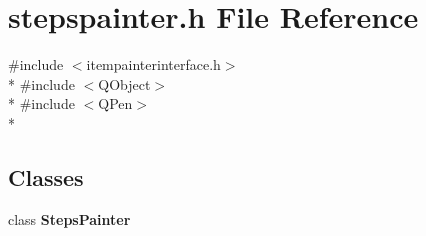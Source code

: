 \section{stepspainter.\+h File Reference}
\label{curve_2painters_2stepspainter_8h}
{\ttfamily \#include $<$itempainterinterface.\+h$>$}\\*
{\ttfamily \#include $<$Q\+Object$>$}\\*
{\ttfamily \#include $<$Q\+Pen$>$}\\*
\subsection*{Classes}
\begin{DoxyCompactItemize}
\item 
class {\bf Steps\+Painter}
\end{DoxyCompactItemize}
